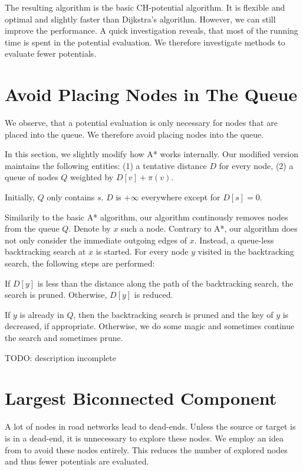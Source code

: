\documentclass[a4paper,UKenglish,cleveref, autoref]{lipics-v2019}
\begin{document}
The resulting algorithm is the basic CH-potential algorithm.
It is flexible and optimal and slightly faster than Dijkstra's algorithm.
However, we can still improve the performance.
A quick investigation reveals, that most of the running time is spent in the potential evaluation.
We therefore investigate methods to evaluate fewer potentials.

\section{Avoid Placing Nodes in The Queue}

We observe, that a potential evaluation is only necessary for nodes that are placed into the queue.
We therefore avoid placing nodes into the queue.

In this section, we slightly modify how A* works internally.
Our modified version maintains the following entities:
(1) a tentative distance $D$ for every node,
(2) a queue of nodes $Q$ weighted by $D[v]+\pi(v)$.

Initially, $Q$ only contains $s$.
$D$ is $+\infty$ everywhere except for $D[s]=0$.

Similarily to the basic A* algorithm, our algorithm continously removes nodes from the queue $Q$.
Denote by $x$ such a node.
Contrary to A*, our algorithm does not only consider the immediate outgoing edges of $x$.
Instead, a queue-less backtracking search at $x$ is started.
For every node $y$ visited in the backtracking search, the following steps are performed:

If $D[y]$ is less than the distance along the path of the backtracking search, the search is pruned.
Otherwise, $D[y]$ is reduced.

If $y$ is already in $Q$, then the backtracking search is pruned and the key of $y$ is decreased, if appropriate.
Otherwise, we do some magic and sometimes continue the search and sometimes prune. 

TODO: description incomplete


\section{Largest Biconnected Component}

A lot of nodes in road networks lead to dead-ends.
Unless the source or target is is in a dead-end, it is unnecessary to explore these nodes.
We employ an idea from \cite{TOPOCORE} to avoid these nodes entirely.
This reduces the number of explored nodes and thus fewer potentials are evaluated.
\end{document}
